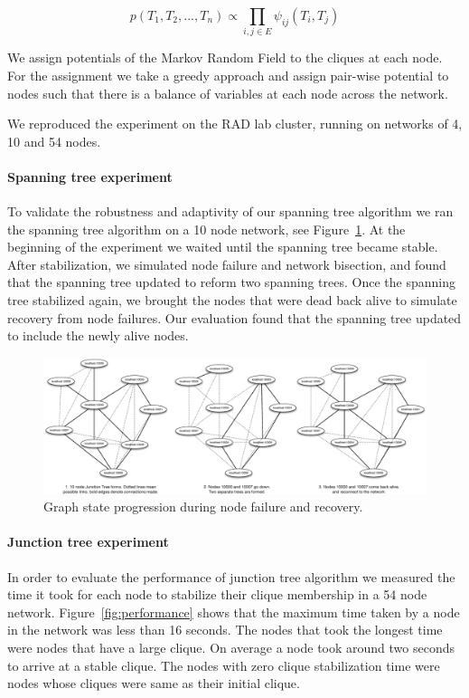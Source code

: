 \[
p(T_1, T_2, ..., T_n) \propto \prod_{i,j \in E} \psi_{ij}(T_i, T_j)
\]

We assign potentials of the Markov Random Field to the cliques at each node.
For the assignment we take a greedy approach and assign pair-wise potential to
nodes such that there is a balance of variables at each node across the
network.

We reproduced the experiment on the RAD lab cluster, running on networks of 4,
10 and 54 nodes.

\paragraph{Spanning tree experiment} To validate the robustness and adaptivity
of our spanning tree algorithm we ran the spanning tree algorithm on a 10 node
network, see Figure~\ref{fig:spanntree_robustness}. At the beginning of the
experiment we waited until the spanning tree became stable. After
stabilization, we simulated node failure and network bisection, and found that
the spanning tree updated to reform two spanning trees. Once the spanning tree
stabilized again, we brought the nodes that were dead back alive to simulate
recovery from node failures. Our evaluation found that the spanning tree
updated to include the newly alive nodes.

\begin{figure}[hptb]
 \centering
 \includegraphics[width=\columnwidth]{figs/spantree_robustness.eps}
 \caption{Graph state progression during node failure and recovery.}
 \label{fig:spanntree_robustness}
\end{figure}

\paragraph{Junction tree experiment} In order to evaluate the performance of
junction tree algorithm we measured the time it took for each node to
stabilize their clique membership in a 54 node network.
Figure~\ref{fig:performance} shows that the maximum time taken by a node in
the network was less than 16 seconds. The nodes that took the longest time
were nodes that have a large clique. On average a node took around two seconds
to arrive at a stable clique. The nodes with zero clique stabilization time
were nodes whose cliques were same as their initial clique.

